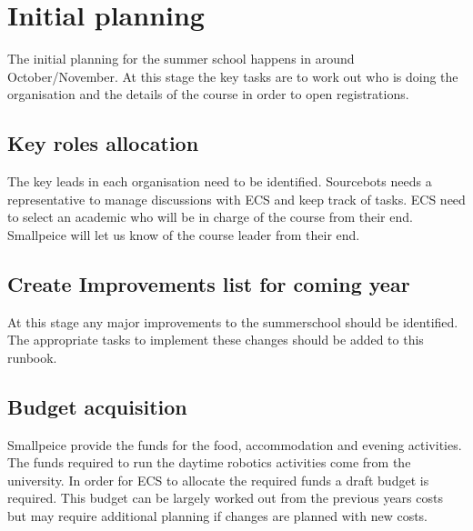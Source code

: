 \section{Initial planning}

The initial planning for the summer school happens in around October/November.
At this stage the key tasks are to work out who is doing the organisation and the details of the course in order to open registrations.

\subsection{Key roles allocation}

The key leads in each organisation need to be identified.
Sourcebots needs a representative to manage discussions with ECS and keep track of tasks.
ECS need to select an academic who will be in charge of the course from their end.
Smallpeice will let us know of the course leader from their end.


\subsection{Create Improvements list for coming year}

At this stage any major improvements to the summerschool should be identified.
The appropriate tasks to implement these changes should be added to this runbook.


\subsection{Budget acquisition}

Smallpeice provide the funds for the food, accommodation and evening activities.
The funds required to run the daytime robotics activities come from the university.
In order for ECS to allocate the required funds a draft budget is required.
This budget can be largely worked out from the previous years costs but may require additional planning if changes are planned with new costs.


